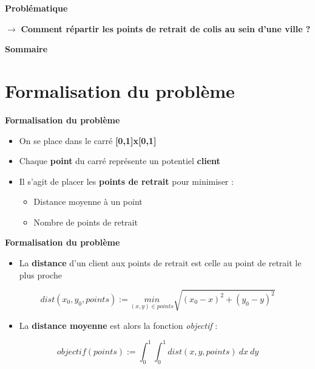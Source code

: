 \documentclass[10pt]{beamer}
\begin{document}
\begin{frame}{\textbf{Problématique}}

    $\longrightarrow$ \textbf{Comment répartir les points de retrait de colis au sein d'une ville ?}

\end{frame}


\begin{frame}{\textbf{Sommaire}}

    \tableofcontents[hideothersubsections]

\end{frame}


\section{Formalisation du problème}
\begin{frame}{\textbf{Formalisation du problème}}

    \begin{itemize}
        \item On se place dans le carré \textbf{[0,1]x[0,1]}
        \item Chaque \textbf{point} du carré représente un potentiel \textbf{client}
        \item Il s'agit de placer les \textbf{points de retrait} pour minimiser :
        \begin{itemize}
            \item Distance moyenne à un point
            \item Nombre de points de retrait
        \end{itemize}
    \end{itemize}

\end{frame}


\begin{frame}{\textbf{Formalisation du problème}}

    \begin{itemize}
        \item La \textbf{distance} d'un client aux points de retrait est celle au point de retrait le plus proche
    \end{itemize}
    $$dist(x_0, y_0, points) := \underset{(x, y)\in{}points}{min} \sqrt{(x_0-x)^2 + (y_0-y)^2}$$
    \newline
    \begin{itemize}
        \item La \textbf{distance moyenne} est alors la fonction \textit{objectif} :
    \end{itemize}
    $$objectif(points) := \int_{0}^{1}\int_{0}^{1} dist(x, y, points) ~dx~dy$$

\end{frame}
\end{document}
